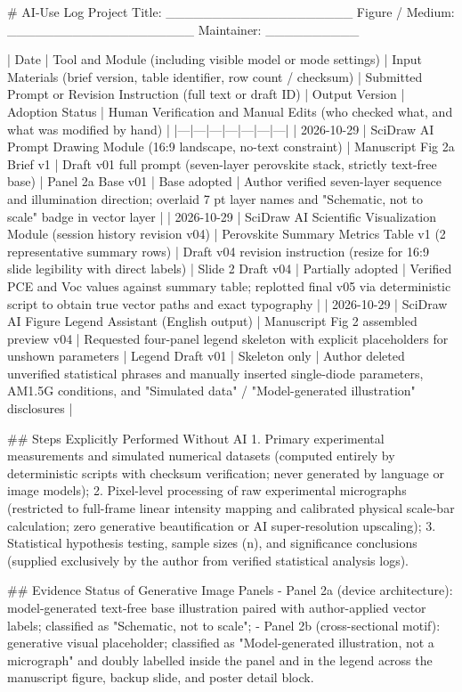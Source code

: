 \begin{Prompt}
# AI-Use Log
Project Title: ____________________  Figure / Medium: ____________________  Maintainer: __________

| Date | Tool and Module (including visible model or mode settings) | Input Materials (brief version, table identifier, row count / checksum) | Submitted Prompt or Revision Instruction (full text or draft ID) | Output Version | Adoption Status | Human Verification and Manual Edits (who checked what, and what was modified by hand) |
|---|---|---|---|---|---|---|
| 2026-10-29 | SciDraw AI Prompt Drawing Module (16:9 landscape, no-text constraint) | Manuscript Fig 2a Brief v1 | Draft v01 full prompt (seven-layer perovskite stack, strictly text-free base) | Panel 2a Base v01 | Base adopted | Author verified seven-layer sequence and illumination direction; overlaid 7 pt layer names and "Schematic, not to scale" badge in vector layer |
| 2026-10-29 | SciDraw AI Scientific Visualization Module (session history revision v04) | Perovskite Summary Metrics Table v1 (2 representative summary rows) | Draft v04 revision instruction (resize for 16:9 slide legibility with direct labels) | Slide 2 Draft v04 | Partially adopted | Verified PCE and Voc values against summary table; replotted final v05 via deterministic script to obtain true vector paths and exact typography |
| 2026-10-29 | SciDraw AI Figure Legend Assistant (English output) | Manuscript Fig 2 assembled preview v04 | Requested four-panel legend skeleton with explicit placeholders for unshown parameters | Legend Draft v01 | Skeleton only | Author deleted unverified statistical phrases and manually inserted single-diode parameters, AM1.5G conditions, and "Simulated data" / "Model-generated illustration" disclosures |

## Steps Explicitly Performed Without AI
1. Primary experimental measurements and simulated numerical datasets (computed entirely by deterministic scripts with checksum verification; never generated by language or image models);
2. Pixel-level processing of raw experimental micrographs (restricted to full-frame linear intensity mapping and calibrated physical scale-bar calculation; zero generative beautification or AI super-resolution upscaling);
3. Statistical hypothesis testing, sample sizes (n), and significance conclusions (supplied exclusively by the author from verified statistical analysis logs).

## Evidence Status of Generative Image Panels
- Panel 2a (device architecture): model-generated text-free base illustration paired with author-applied vector labels; classified as "Schematic, not to scale";
- Panel 2b (cross-sectional motif): generative visual placeholder; classified as "Model-generated illustration, not a micrograph" and doubly labelled inside the panel and in the legend across the manuscript figure, backup slide, and poster detail block.


\end{Prompt}
